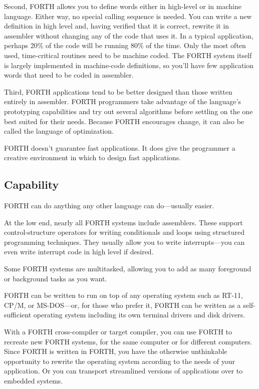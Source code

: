 Second, FORTH allows you to define words either in high-level or in
machine language. Either way, no special calling sequence is needed.
You can write a new definition in high level and, having verified
that it is correct, rewrite it in assembler without changing any of
the code that uses it. In a typical application, perhaps 20\% of the
code will be running 80\% of the time. Only the most often used, time-critical
routines need to be machine coded. The FORTH system itself is largely
implemented in machine-code definitions, so you'll have few application
words that need to be coded in assembler.

Third, FORTH applications tend to be better designed than those written
entirely in assembler. FORTH programmers take advantage of the language's
prototyping capabilities and try out several algorithms before settling
on the one best suited for their needs. Because FORTH encourages change,
it can also be called the language of optimization.

FORTH doesn't guarantee fast applications. It does give the programmer
a creative environment in which to design fast applications.


\subsection*{Capability}

FORTH can do anything any other language can do---usually easier.

At the low end, nearly all FORTH systems include assemblers. These
support control-structure operators for writing conditionals and loops
using structured programming techniques. They usually allow you to
write interrupts---you can even write interrupt code in high level
if desired.

Some FORTH systems are multitasked, allowing you to add as many foreground
or background tasks as you want.

FORTH can be written to run on top of any operating system such as
RT-11, CP/M, or MS-DOS---or, for those who prefer it, FORTH can be
written as a self-sufficient operating system including its own terminal
drivers and disk drivers.

With a FORTH cross-compiler or target compiler, you can use FORTH
to recreate new FORTH systems, for the same computer or for different
computers. Since FORTH is written in FORTH, you have the otherwise
unthinkable opportunity to rewrite the operating system according
to the needs of your application. Or you can transport streamlined
versions of applications over to embedded systems. 


